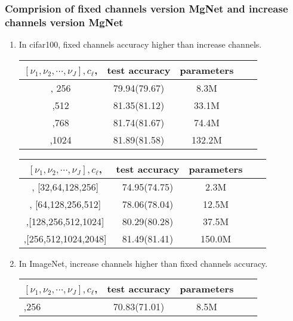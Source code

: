 \subsubsection{Comprision of  fixed channels version MgNet  and increase channels version MgNet}
\begin{enumerate}
\item In cifar100, fixed channels accuracy higher than increase channels.
\begin{table}[!htbp]
	\begin{center}

		\begin{tabular}{|c|c|c|c|c|}
			\hline
			$[\nu_1,\nu_2,\cdots,\nu_J], c_\ell$,   &  test accuracy
			& parameters   \tabularnewline
			\hline
			[2,2,2,2], 256    &  79.94(79.67)  & 8.3M
			\tabularnewline
			\hline			
			[2,2,2,2],512     & 81.35(81.12)     & 33.1M
			\tabularnewline
			\hline
			[2,2,2,2],768     & 81.74(81.67)     & 74.4M
			\tabularnewline
			\hline
			[2,2,2,2],1024    & 81.89(81.58)   & 132.2M
			\tabularnewline
			\hline						
		\end{tabular}
	\end{center}
\end{table}

\begin{table}[!htbp]
	\begin{center}
		\begin{tabular}{|c|c|c|c|c|}
			\hline
			$[\nu_1,\nu_2,\cdots,\nu_J], c_\ell$,  &  test accuracy
			& parameters  \tabularnewline
			\hline
			[2,2,2,2], [32,64,128,256]   &  74.95(74.75)  & 2.3M
			\tabularnewline
			\hline			
			[2,2,2,2], [64,128,256,512]      & 78.06(78.04)     & 12.5M
			\tabularnewline
			\hline
			[2,2,2,2],[128,256,512,1024]     & 80.29(80.28)      & 37.5M
			\tabularnewline
			\hline
			[2,2,2,2],[256,512,1024,2048]     & 81.49(81.41)    & 150.0M
			\tabularnewline
			\hline						
		\end{tabular}
	\end{center}
\end{table}




\item In ImageNet, increase channels higher than fixed channels accuracy.
\begin{table}[!htbp]
    \begin{center}
        \begin{tabular}{| l | c | c | c | r |}
        \hline
        $[\nu_1,\nu_2,\cdots,\nu_J], c_\ell$,  &  test accuracy & parameters
        \tabularnewline
        \hline
        [2,2,2,2],256                           &    70.83(71.01)&     8.5M
        \tabularnewline
        \hline
        \end{tabular}
     \end{center}
\end{table}


\end{enumerate}
